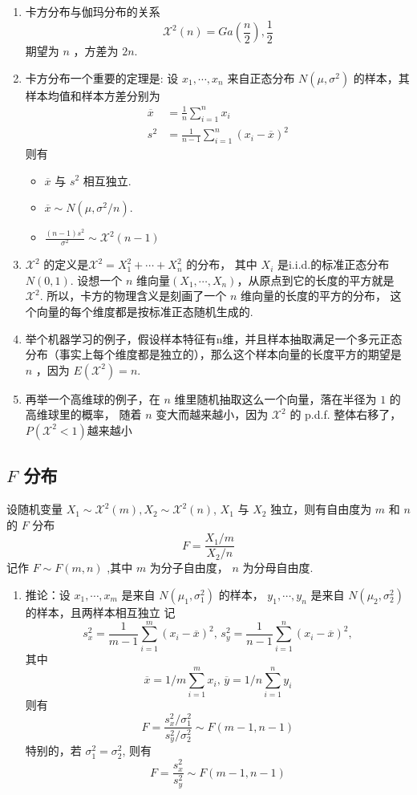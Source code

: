 \documentclass[a5paper,12pt]{article}
\begin{document}
\begin{enumerate}
  \item 卡方分布与伽玛分布的关系
  \[
  \mathcal{X}^2(n) = Ga(\frac{n}{2}), \frac{1}{2}
  \]
  期望为 $n$ ，方差为 $2n$.
  \item 卡方分布一个重要的定理是: 设 $x_1,\cdots,x_n$ 来自正态分布 $N(\mu,\sigma^2)$ 的样本，其样本均值和样本方差分别为
  \[
  \begin{aligned}
    \overline{x} &= \frac1n \sum_{i=1}^{n} x_i \\
    s^2 &= \frac{1}{n-1} \sum_{i=1}^{n} (x_i - \overline{x})^2
  \end{aligned}
  \]
  则有
  \begin{itemize}
    \item $\overline{x}$ 与  $s^2$ 相互独立.
    \item $\overline{x} \sim N(\mu,\sigma^2/n)$.
    \item $\frac{(n-1)s^2}{\sigma^2} \sim \mathcal{X}^2(n-1)$
  \end{itemize}

  \item $\mathcal{X}^2$ 的定义是$\mathcal{X}^2 = X_1^2+\cdots+X_n^2$ 的分布，
  其中 $X_i$ 是i.i.d.的标准正态分布 $N(0,1)$. 设想一个 $n$  维向量$(X_1,\cdots,X_n)$，从原点到它的长度的平方就是 $\mathcal{X}^2$.
  所以，卡方的物理含义是刻画了一个 $n$  维向量的长度的平方的分布，
  这个向量的每个维度都是按标准正态随机生成的.

  \item 举个机器学习的例子，假设样本特征有n维，并且样本抽取满足一个多元正态分布（事实上每个维度都是独立的），那么这个样本向量的长度平方的期望是 $n$ ，因为 $E(\mathcal{X}^2)=n$.
  \item  再举一个高维球的例子，在 $n$  维里随机抽取这么一个向量，落在半径为 $1$  的高维球里的概率，
  随着 $n$  变大而越来越小，因为 $\mathcal{X}^2$ 的 p.d.f. 整体右移了，$P(\mathcal{X}^2<1)$越来越小

\end{enumerate}


\subsection{ $F$ 分布}
设随机变量 $X_1 \sim \mathcal{X}^2(m), X_2\sim \mathcal{X}^2(n)$, $X_1$ 与  $X_2$ 独立，则有自由度为 $m$ 和 $n$ 的 $F$ 分布
\[
F = \frac{X_1/m}{X_2/n}
\]
记作  $F \sim F(m,n)$ ,其中  $m$ 为分子自由度， $n$ 为分母自由度.

\begin{enumerate}
  \item 推论：设 $x_1,\cdots,x_m$ 是来自 $N(\mu_1,\sigma_1^2)$ 的样本，
  $y_1,\cdots,y_n$ 是来自 $N(\mu_2,\sigma_2^2)$ 的样本，且两样本相互独立
  记
  \[
  s_x^2 = \frac{1}{m-1} \sum_{i=1}^{m}(x_i - \overline{x})^2, \,
  s_y^2 = \frac{1}{n-1} \sum_{i=1}^{n}(x_i - \overline{x})^2,
  \]
  其中
  \[
  \overline{x} = 1/m\sum_{i=1}^{m}x_i, \,
  \overline{y} = 1/n\sum_{i=1}^{n}y_i
  \]
  则有
  \[
  F =  \frac{s_x^2 /\sigma_1^2}{ s_y^2/\sigma_2^2} \sim F(m-1,n-1)
  \]
  特别的，若 $\sigma_1^2 = \sigma_2^2$, 则有
  \[
  F=\frac{s_x^2}{s_y^2} \sim F(m-1,n-1)
  \]
\end{enumerate}
\end{document}
